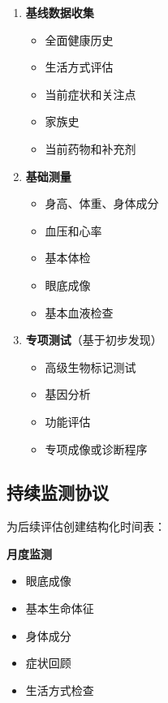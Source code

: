 \documentclass[
  Letterpaper,
]{scrbook}
\providecommand{\tightlist}{%
  \setlength{\itemsep}{0pt}\setlength{\parskip}{0pt}}\usepackage{longtable,booktabs,array}
\begin{document}
\begin{enumerate}
\def\labelenumi{\arabic{enumi}.}
\tightlist
\item
  \textbf{基线数据收集}

  \begin{itemize}
  \tightlist
  \item
    全面健康历史
  \item
    生活方式评估
  \item
    当前症状和关注点
  \item
    家族史
  \item
    当前药物和补充剂
  \end{itemize}
\item
  \textbf{基础测量}

  \begin{itemize}
  \tightlist
  \item
    身高、体重、身体成分
  \item
    血压和心率
  \item
    基本体检
  \item
    眼底成像
  \item
    基本血液检查
  \end{itemize}
\item
  \textbf{专项测试}（基于初步发现）

  \begin{itemize}
  \tightlist
  \item
    高级生物标记测试
  \item
    基因分析
  \item
    功能评估
  \item
    专项成像或诊断程序
  \end{itemize}
\end{enumerate}

\subsection{持续监测协议}\label{ux6301ux7eedux76d1ux6d4bux534fux8bae}

为后续评估创建结构化时间表：

\textbf{月度监测}

\begin{itemize}
\tightlist
\item
  眼底成像
\item
  基本生命体征
\item
  身体成分
\item
  症状回顾
\item
  生活方式检查
\end{itemize}
\end{document}
